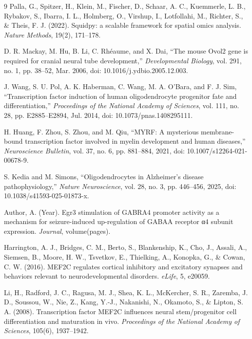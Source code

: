 \documentclass[10pt,a4paper]{article}
\begin{document}
\begin{thebibliography}{9}
Palla, G., Spitzer, H., Klein, M., Fischer, D., Schaar, A. C., Kuemmerle, L. B., Rybakov, S., Ibarra, I. L., Holmberg, O., Virshup, I., Lotfollahi, M., Richter, S., \& Theis, F. J. (2022). Squidpy: a scalable framework for spatial omics analysis. \emph{Nature Methods}, 19(2), 171–178.

 D. R. Mackay, M. Hu, B. Li, C. Rhéaume, and X. Dai, ``The mouse Ovol2 gene is required for cranial neural tube development,'' \emph{Developmental Biology}, vol. 291, no. 1, pp. 38--52, Mar. 2006, doi: 10.1016/j.ydbio.2005.12.003.

 J. Wang, S. U. Pol, A. K. Haberman, C. Wang, M. A. O'Bara, and F. J. Sim, ``Transcription factor induction of human oligodendrocyte progenitor fate and differentiation,'' \emph{Proceedings of the National Academy of Sciences}, vol. 111, no. 28, pp. E2885--E2894, Jul. 2014, doi: 10.1073/pnas.1408295111.

H. Huang, F. Zhou, S. Zhou, and M. Qiu, ``MYRF: A mysterious membrane-bound transcription factor involved in myelin development and human diseases,'' \emph{Neuroscience Bulletin}, vol. 37, no. 6, pp. 881--884, 2021, doi: 10.1007/s12264-021-00678-9.

S. Kedia and M. Simons, ``Oligodendrocytes in Alzheimer's disease pathophysiology,'' \emph{Nature Neuroscience}, vol. 28, no. 3, pp. 446--456, 2025, doi: 10.1038/s41593-025-01873-x.

Author, A. (Year). Egr3 stimulation of GABRA4 promoter activity as a mechanism for seizure-induced up-regulation of GABAA receptor α4 subunit expression. \emph{Journal}, volume(pages).

Harrington, A. J., Bridges, C. M., Berto, S., Blankenship, K., Cho, J., Assali, A., Siemsen, B., Moore, H. W., Tsvetkov, E., Thielking, A., Konopka, G., \& Cowan, C. W. (2016). MEF2C regulates cortical inhibitory and excitatory synapses and behaviors relevant to neurodevelopmental disorders. \emph{eLife}, 5, e20059.

Li, H., Radford, J. C., Ragusa, M. J., Shea, K. L., McKercher, S. R., Zaremba, J. D., Soussou, W., Nie, Z., Kang, Y.-J., Nakanishi, N., Okamoto, S., \& Lipton, S. A. (2008). Transcription factor MEF2C influences neural stem/progenitor cell differentiation and maturation in vivo. \emph{Proceedings of the National Academy of Sciences}, 105(6), 1937–1942.


\end{thebibliography}
\end{document}
